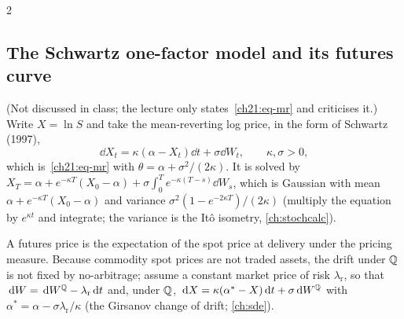\begin{paracol}{2}
\subsection{The Schwartz one-factor model and its futures curve}
(Not discussed in class; the lecture only states~\eqref{ch21:eq-mr} and criticises it.) Write $X=\ln S$ and take the mean-reverting log price, in the form of Schwartz (1997),
\begin{equation}\label{ch21:eq-ou}
  \dd X_t=\kappa(\alpha-X_t)\dd t+\sigma\dd W_t,\qquad\kappa,\sigma>0,
\end{equation}
which is~\eqref{ch21:eq-mr} with $\theta=\alpha+\sigma^2/(2\kappa)$. It is solved by $X_T=\alpha+e^{-\kappa T}(X_0-\alpha)+\sigma\int_0^Te^{-\kappa(T-s)}\dd W_s$, which is Gaussian with mean $\alpha+e^{-\kappa T}(X_0-\alpha)$ and variance
$\sigma^2(1-e^{-2\kappa T})/(2\kappa)$ (multiply the equation by $e^{\kappa t}$ and integrate; the variance is the It\^o isometry, \cref{ch:stochcalc}).

A futures price is the expectation of the spot price at delivery under the pricing measure. Because commodity spot prices are not traded assets, the drift under $\mathbb{Q}$ is not fixed by no-arbitrage; assume a constant market price of risk $\lambda_{\mathrm{r}}$, so that $\,\mathrm{d} W=\,\mathrm{d} W^{\mathbb{Q}}-\lambda_{\mathrm{r}}\,\mathrm{d} t$ and, under $\mathbb{Q}$,
$\,\mathrm{d} X=\kappa(\alpha^*-X)\,\mathrm{d} t+\sigma\,\mathrm{d} W^{\mathbb{Q}}$ with $\alpha^*=\alpha-\sigma\lambda_{\mathrm{r}}/\kappa$ (the Girsanov change of drift; \cref{ch:sde}).


\end{paracol}
